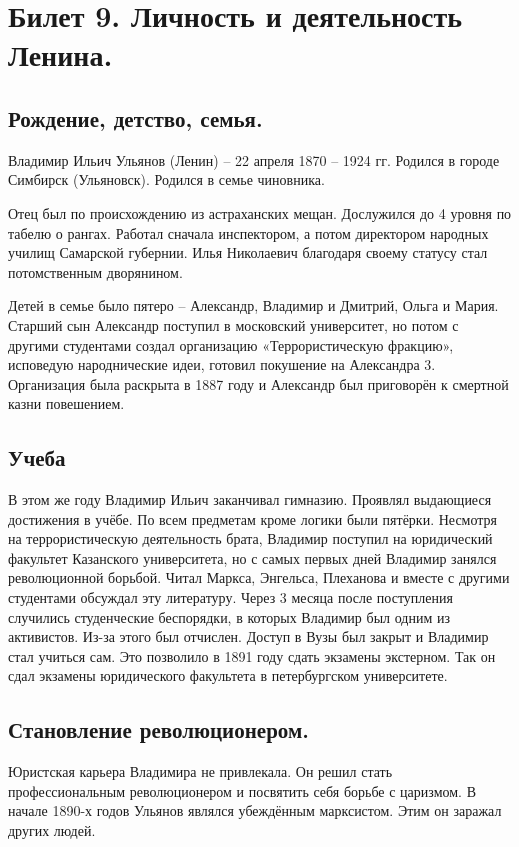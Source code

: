 \section{Билет 9. Личность и деятельность Ленина.}

\subsection{Рождение, детство, семья.}

Владимир Ильич Ульянов (Ленин) – 22 апреля 1870 – 1924 гг. Родился в городе Симбирск (Ульяновск). Родился в семье чиновника. 

Отец был по происхождению из астраханских мещан. Дослужился до 4 уровня по табелю о рангах. Работал сначала инспектором, а потом директором народных училищ Самарской губернии. Илья Николаевич благодаря своему статусу стал потомственным дворянином.

Детей в семье было пятеро – Александр, Владимир и Дмитрий, Ольга и Мария. Старший сын Александр поступил в московский университет, но потом с другими студентами создал организацию «Террористическую фракцию», исповедую народнические идеи, готовил покушение на Александра 3. Организация была раскрыта в 1887 году и Александр был приговорён к смертной казни повешением. 

\subsection{Учеба}

В этом же году Владимир Ильич заканчивал гимназию. Проявлял выдающиеся достижения в учёбе. По всем предметам кроме логики были пятёрки. Несмотря на террористическую деятельность брата, Владимир поступил на юридический факультет Казанского университета, но с самых первых дней Владимир занялся революционной борьбой. Читал Маркса, Энгельса, Плеханова и вместе с другими студентами обсуждал эту литературу. Через 3 месяца после поступления случились студенческие беспорядки, в которых Владимир был одним из активистов. Из-за этого был отчислен. Доступ в Вузы был закрыт и Владимир стал учиться сам. Это позволило в 1891 году сдать экзамены экстерном. Так он сдал экзамены юридического факультета в петербургском университете.

\subsection{Становление революционером.}

Юристская карьера Владимира не привлекала. Он решил стать профессиональным революционером и посвятить себя борьбе с царизмом. В начале 1890-х годов Ульянов являлся убеждённым марксистом. Этим он заражал других людей.

